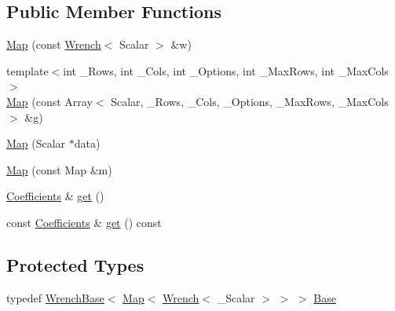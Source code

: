 \subsection*{Public Member Functions}
\begin{DoxyCompactItemize}
\item 
\hyperlink{class_map_3_01_wrench_3_01___scalar_01_4_00_01_map_options_00_01_stride_type_01_4_ab778c7158f5d29d76672346ecfe4e3ea}{Map} (const \hyperlink{class_wrench}{Wrench}$<$ Scalar $>$ \&w)
\item 
{\footnotesize template$<$int \+\_\+\+Rows, int \+\_\+\+Cols, int \+\_\+\+Options, int \+\_\+\+Max\+Rows, int \+\_\+\+Max\+Cols$>$ }\\\hyperlink{class_map_3_01_wrench_3_01___scalar_01_4_00_01_map_options_00_01_stride_type_01_4_a3691be9d7061572f33fec65663c620a5}{Map} (const Array$<$ Scalar, \+\_\+\+Rows, \+\_\+\+Cols, \+\_\+\+Options, \+\_\+\+Max\+Rows, \+\_\+\+Max\+Cols $>$ \&g)
\item 
\hyperlink{class_map_3_01_wrench_3_01___scalar_01_4_00_01_map_options_00_01_stride_type_01_4_a64c75a02aa57da4b0d5fdeda620912e1}{Map} (Scalar $\ast$data)
\item 
\hyperlink{class_map_3_01_wrench_3_01___scalar_01_4_00_01_map_options_00_01_stride_type_01_4_a4f2480bbfd79778a5feb90f8beb30601}{Map} (const Map \&m)
\item 
\hyperlink{class_map_3_01_wrench_3_01___scalar_01_4_00_01_map_options_00_01_stride_type_01_4_abfc1bf3f7dc1d3051325edad634172e8}{Coefficients} \& \hyperlink{class_map_3_01_wrench_3_01___scalar_01_4_00_01_map_options_00_01_stride_type_01_4_ac2661fbf02f8a1009057aee6667b3d95}{get} ()
\item 
const \hyperlink{class_map_3_01_wrench_3_01___scalar_01_4_00_01_map_options_00_01_stride_type_01_4_abfc1bf3f7dc1d3051325edad634172e8}{Coefficients} \& \hyperlink{class_map_3_01_wrench_3_01___scalar_01_4_00_01_map_options_00_01_stride_type_01_4_ab25730235675b6ac5e04b222931a5050}{get} () const
\end{DoxyCompactItemize}
\subsection*{Protected Types}
\begin{DoxyCompactItemize}
\item 
typedef \hyperlink{class_wrench_base}{Wrench\+Base}$<$ \hyperlink{class_map_3_01_wrench_3_01___scalar_01_4_00_01_map_options_00_01_stride_type_01_4_ab778c7158f5d29d76672346ecfe4e3ea}{Map}$<$ \hyperlink{class_wrench}{Wrench}$<$ \+\_\+\+Scalar $>$ $>$ $>$ \hyperlink{class_map_3_01_wrench_3_01___scalar_01_4_00_01_map_options_00_01_stride_type_01_4_ae2acfdad9b8a19976e088f86e664d657}{Base}
\end{DoxyCompactItemize}
